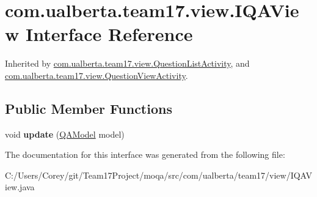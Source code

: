 \hypertarget{interfacecom_1_1ualberta_1_1team17_1_1view_1_1_i_q_a_view}{\section{com.\+ualberta.\+team17.\+view.\+I\+Q\+A\+View Interface Reference}
\label{interfacecom_1_1ualberta_1_1team17_1_1view_1_1_i_q_a_view}
}


Inherited by \hyperlink{classcom_1_1ualberta_1_1team17_1_1view_1_1_question_list_activity}{com.\+ualberta.\+team17.\+view.\+Question\+List\+Activity}, and \hyperlink{classcom_1_1ualberta_1_1team17_1_1view_1_1_question_view_activity}{com.\+ualberta.\+team17.\+view.\+Question\+View\+Activity}.

\subsection*{Public Member Functions}
\begin{DoxyCompactItemize}
\item 
\hypertarget{interfacecom_1_1ualberta_1_1team17_1_1view_1_1_i_q_a_view_a7a7cd7ff1d70cede2e79f30464c99847}{void {\bfseries update} (\hyperlink{classcom_1_1ualberta_1_1team17_1_1_q_a_model}{Q\+A\+Model} model)}\label{interfacecom_1_1ualberta_1_1team17_1_1view_1_1_i_q_a_view_a7a7cd7ff1d70cede2e79f30464c99847}

\end{DoxyCompactItemize}


The documentation for this interface was generated from the following file\+:\begin{DoxyCompactItemize}
\item 
C\+:/\+Users/\+Corey/git/\+Team17\+Project/moqa/src/com/ualberta/team17/view/I\+Q\+A\+View.\+java\end{DoxyCompactItemize}
